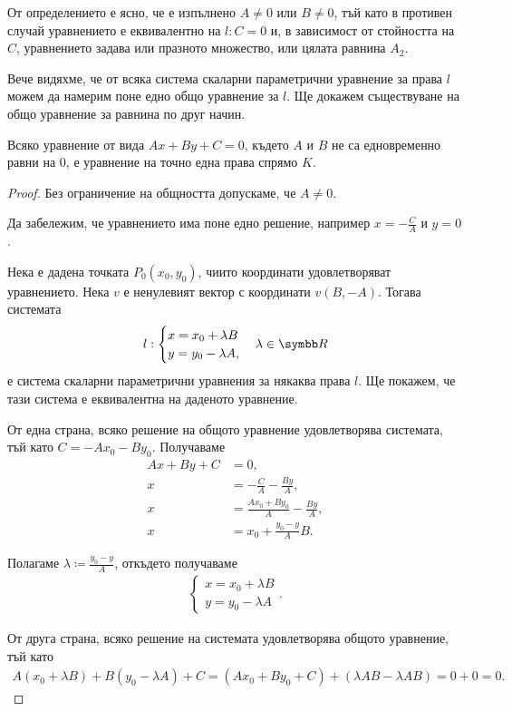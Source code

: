 \documentclass[numbers=endperiod, bibliography=totocnumbered]{scrartcl}
\begin{document}
\begin{remark}
  От определението е ясно, че е изпълнено \( A \neq 0 \) или \( B \neq 0 \), тъй като в противен случай уравнението е еквивалентно на \( l: C = 0 \) и, в зависимост от стойността на \( C \), уравнението задава или празното множество, или цялата равнина \( A_2 \).
\end{remark}

Вече видяхме, че от всяка система скаларни параметрични уравнение за права \( l \) можем да намерим поне едно общо уравнение за \( l \). Ще докажем съществуване на общо уравнение за равнина по друг начин.

\begin{proposition}
  Всяко уравнение от вида \( Ax + By + C = 0 \), където \( A \) и \( B \) не са едновременно равни на \( 0 \), е уравнение на точно една права спрямо \( K \).
\end{proposition}
\begin{proof}
  Без ограничение на общността допускаме, че \( A \neq 0 \).

  Да забележим, че уравнението има поне едно решение, например \( x = -\frac C A \) и \( y = 0 \).

  Нека е дадена точката \( P_0(x_0, y_0) \), чиито координати удовлетворяват уравнението. Нека \( v \) е ненулевият вектор с координати \( v(B, -A) \). Тогава системата
  \begin{align*}
    l: \begin{cases}
      x = x_0 + \lambda B \\
      y = y_0 - \lambda A,
    \end{cases}
    \lambda \in \R
  \end{align*}
  е система скаларни параметрични уравнения за някаква права \( l \). Ще покажем, че тази система е еквивалентна на даденото уравнение.

  От една страна, всяко решение на общото уравнение удовлетворява системата, тъй като \( C = -Ax_0 - By_0 \). Получаваме
  \begin{align*}
    Ax + By + C &= 0, \\
    x &= -\frac C A -\frac {By} A, \\
    x &= \frac {Ax_0 + By_0} A -\frac {By} A, \\
    x &= x_0 + \frac {y_0 - y} A B.
  \end{align*}

  Полагаме \( \lambda \coloneqq \frac{y_0 - y} A \), откъдето получаваме
  \begin{align*}
    \begin{cases}
      x = x_0 + \lambda B \\
      y = y_0 - \lambda A
    \end{cases}.
  \end{align*}

  От друга страна, всяко решение на системата удовлетворява общото уравнение, тъй като
  \begin{align*}
    A (x_0 + \lambda B) + B (y_0 - \lambda A) + C
    =
    (A x_0 + B y_0 + C) + (\lambda AB - \lambda AB)
    =
    0 + 0 = 0.
  \end{align*}
\end{proof}
\end{document}
